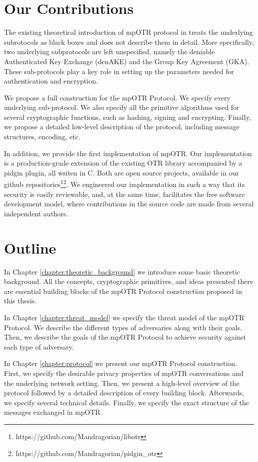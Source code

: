 \section{Our Contributions}
The existing theoretical introduction of mpOTR protocol in \cite{mpotr} treats the underlying subrotocols as black boxes and does not describe them in detail. More specifically, two underlying subprotocols are left unspecified, namely the deniable Authenticated Key Exchange (denAKE) and the Group Key Agreement (GKA). These sub-protocols play a key role in setting up the parameters needed for authentication and encryption.

We propose a full construction for the mpOTR Protocol. We specify every underlying sub-protocol. We also specify all the primitive algorithms used for several cryptographic functions, such as hashing, signing and encrypting. Finally, we propose a detailed low-level description of the protocol, including message structures, encoding, etc.

In addition, we provide the first implementation of mpOTR. Our implementation is a production-grade extension of the existing OTR library accompanied by a pidgin plugin, all writen in C. Both are open source projects, available in our github repositories\footnote{https://github.com/Mandragorian/libotr}\footnote{https://github.com/Mandragorian/pidgin\_otr}. We engineered our implementation in such a way that its security is easily reviewable, and, at the same time, facilitates the free software development model, where contributions in the source code are made from several independent authors.

\section{Outline}
In Chapter \ref{chapter:theoretic_background} we introduce some basic theoretic background. All the concepts, cryptographic primitives, and ideas presented there are essential building blocks of the mpOTR Protocol construction proposed in this thesis.

In Chapter \ref{chapter:threat_model} we specify the threat model of the mpOTR Protocol. We describe the different types of adversaries along with their goals. Then, we describe the goals of the mpOTR Protocol to achieve security against each type of adversary.

In Chapter \ref{chapter:protocol} we present our mpOTR Protocol construction. First, we specify the desirable privacy properties of mpOTR conversations and the underlying network setting. Then, we present a high-level overview of the protocol followed by a detailed description of every building block. Afterwards, we specify several technical details. Finally, we specify the exact structure of the messages exchanged in mpOTR.

